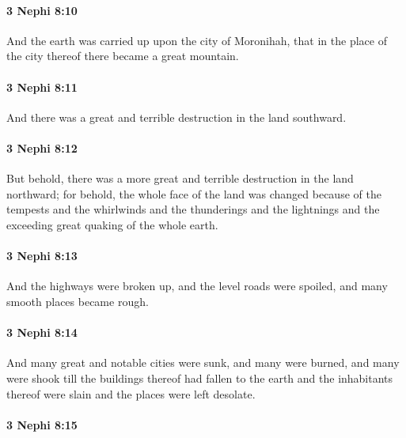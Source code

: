 		\paragraph{3 Nephi 8:10} %
			\label{3NEPHI-8-10}

			And the earth was carried up upon the city of Moronihah,
			that in the place of the city thereof there became a great mountain.

		\paragraph{3 Nephi 8:11} %
			\label{3NEPHI-8-11}

			And there was a great and terrible destruction in the land southward.

		\paragraph{3 Nephi 8:12} %
			\label{3NEPHI-8-12}

			But behold, there was a more great and terrible destruction in the land northward;
			for behold, the whole face of the land was changed
			because of the tempests and the whirlwinds
			and the thunderings and the lightnings
			and the exceeding great quaking of the whole earth.

		\paragraph{3 Nephi 8:13} %
			\label{3NEPHI-8-13}

			And the highways were broken up,
			and the level roads were spoiled,
			and many smooth places became rough.

		\paragraph{3 Nephi 8:14} %
			\label{3NEPHI-8-14}

			And many great and notable cities were sunk,
			and many were burned,
			and many were shook till the buildings thereof had fallen to the earth
			and the inhabitants thereof were slain
			and the places were left desolate.

		\paragraph{3 Nephi 8:15} %
			\label{3NEPHI-8-15}

